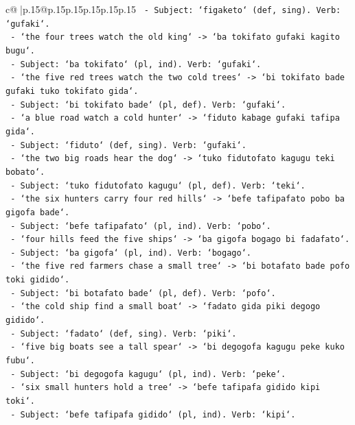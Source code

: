 \documentclass{article}
\begin{document}
{\begin{supertabular}{c@{$\;$}|p{.15\linewidth}@{}p{.15\linewidth}p{.15\linewidth}p{.15\linewidth}p{.15\linewidth}p{.15\linewidth}}
{{{\texttt{     {-} Subject: `figaketo` (def, sing). Verb: `gufaki`.} \\
\texttt{   {-} `the four trees watch the old king` {-}> `ba tokifato gufaki kagito bugu`.} \\
\texttt{     {-} Subject: `ba tokifato` (pl, ind). Verb: `gufaki`.} \\
\texttt{   {-} `the five red trees watch the two cold trees` {-}> `bi tokifato bade gufaki tuko tokifato gida`.} \\
\texttt{     {-} Subject: `bi tokifato bade` (pl, def). Verb: `gufaki`.} \\
\texttt{   {-} `a blue road watch a cold hunter` {-}> `fiduto kabage gufaki tafipa gida`.} \\
\texttt{     {-} Subject: `fiduto` (def, sing). Verb: `gufaki`.} \\
\texttt{   {-} `the two big roads hear the dog` {-}> `tuko fidutofato kagugu teki bobato`.} \\
\texttt{     {-} Subject: `tuko fidutofato kagugu` (pl, def). Verb: `teki`.} \\
\texttt{   {-} `the six hunters carry four red hills` {-}> `befe tafipafato pobo ba gigofa bade`.} \\
\texttt{     {-} Subject: `befe tafipafato` (pl, ind). Verb: `pobo`.} \\
\texttt{   {-} `four hills feed the five ships` {-}> `ba gigofa bogago bi fadafato`.} \\
\texttt{     {-} Subject: `ba gigofa` (pl, ind). Verb: `bogago`.} \\
\texttt{   {-} `the five red farmers chase a small tree` {-}> `bi botafato bade pofo toki gidido`.} \\
\texttt{     {-} Subject: `bi botafato bade` (pl, def). Verb: `pofo`.} \\
\texttt{   {-} `the cold ship find a small boat` {-}> `fadato gida piki degogo gidido`.} \\
\texttt{     {-} Subject: `fadato` (def, sing). Verb: `piki`.} \\
\texttt{   {-} `five big boats see a tall spear` {-}> `bi degogofa kagugu peke kuko fubu`.} \\
\texttt{     {-} Subject: `bi degogofa kagugu` (pl, ind). Verb: `peke`.} \\
\texttt{   {-} `six small hunters hold a tree` {-}> `befe tafipafa gidido kipi toki`.} \\
\texttt{     {-} Subject: `befe tafipafa gidido` (pl, ind). Verb: `kipi`.} \\
}}}
\end{supertabular}}
\end{document}
